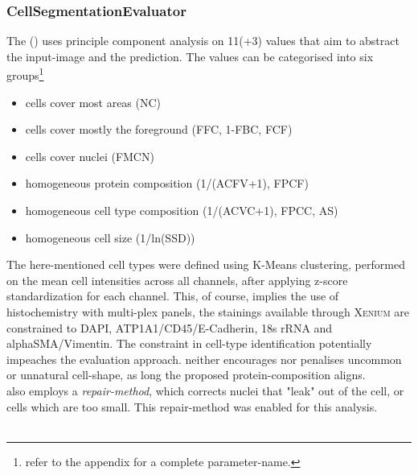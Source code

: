 \subsubsection*{CellSegmentationEvaluator}
The  () \cite{chen_evaluation_2023} uses principle component analysis on 11(+3) values that aim to abstract the input-image and the prediction. The values can be categorised into six groups\footnote{refer to the appendix for a complete parameter-name.}
\begin{itemize}
    \item[1)] cells cover most areas (NC)
    \item[2)] cells cover mostly the foreground (FFC, 1-FBC, FCF)
    \item[3)] cells cover nuclei (FMCN)
    \item[4)] homogeneous protein composition (1/(ACFV+1), FPCF)
    \item[5)] homogeneous cell type composition (1/(ACVC+1), FPCC, AS) 
    \item[6)] homogeneous cell size (1/ln(SSD))
\end{itemize}
The here-mentioned cell types were defined using K-Means clustering, performed on the mean cell intensities across all channels, after applying z-score standardization for each channel. This, of course, implies the use of histochemistry with multi-plex panels, the stainings available through \textsc{Xenium} are constrained to DAPI, ATP1A1/CD45/E-Cadherin, 18s rRNA and alphaSMA/Vimentin. The constraint in cell-type identification potentially impeaches the evaluation approach.  neither encourages nor penalises uncommon or unnatural cell-shape, as long the proposed protein-composition aligns.\\
 also employs a \emph{repair-method}, which corrects nuclei that "leak" out of the cell, or cells which are too small. This repair-method was enabled for this analysis.\\
\\

